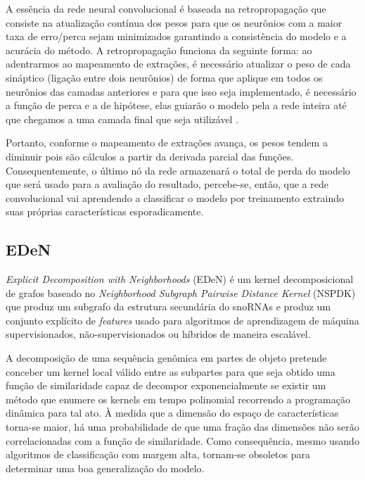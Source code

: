 A essência da rede neural convolucional é baseada na retropropagação que consiste na atualização contínua dos pesos para que os neurônios com a maior taxa de erro/perca sejam minimizados garantindo a consistência do modelo e a acurácia do método. A retropropagação funciona da seguinte forma: ao adentrarmos ao mapeamento de extrações, é necessário atualizar o peso de cada sináptico (ligação entre dois neurônios) de forma que aplique em todos os neurônios das camadas anteriores e para que isso seja implementado, é necessário a função de perca e a de hipótese, elas guiarão o modelo pela a rede inteira até que chegamos a uma camada final que seja utilizável \cite{cnn-blog}.

Portanto, conforme o mapeamento de extrações avança, os pesos tendem a diminuir pois são cálculos a partir da derivada parcial das funções. Consequentemente, o último nó da rede armazenará o total de perda do modelo que será usado para a avaliação do resultado, percebe-se, então, que a rede convolucional vai aprendendo a classificar o modelo por treinamento extraindo suas próprias características esporadicamente.

\subsection{EDeN}

\textit{Explicit Decomposition with Neighborhoods} (EDeN) é um kernel decomposicional de grafos baseado no \textit{Neighborhood Subgraph Pairwise Distance Kernel} (NSPDK) que produz um subgrafo da estrutura secundária do snoRNAs e produz um conjunto explícito de \textit{features} usado para algoritmos de aprendizagem de máquina supervisionados, não-supervisionados ou híbridos de maneira escalável.

A decomposição de uma sequência genômica em partes de objeto pretende conceber um kernel local válido entre as subpartes para que seja obtido uma função de similaridade capaz de decompor exponencialmente se existir um método que enumere os kernels em tempo polinomial recorrendo a programação dinâmica para tal ato. À medida que a dimensão do espaço de características torna-se maior, há uma probabilidade de que uma fração das dimensões não serão correlacionadas com a função de similaridade. Como consequência, mesmo usando algoritmos de classificação com margem alta, tornam-se obsoletos para determinar uma boa generalização do modelo. \cite{eden-nspdk}

